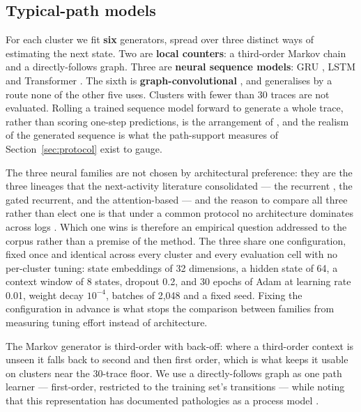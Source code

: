 \subsection{Typical-path models}\label{sec:typical-paths}

For each cluster we fit \textbf{six} generators, spread over three distinct ways of estimating
the next state. Two are \textbf{local counters}: a third-order Markov chain and a
directly-follows graph. Three are \textbf{neural sequence models}: GRU \citep{cho2014gru}, LSTM
\citep{hochreiter1997lstm} and Transformer \citep{vaswani2017attention}. The sixth is
\textbf{graph-convolutional} \citep{kipf2017gcn}, and generalises by a route none of the other
five uses. Clusters with fewer than 30 traces are not evaluated. Rolling a trained sequence model
forward to generate a whole trace, rather than scoring one-step predictions, is the arrangement
of \citet{camargo2019lstm}, and the realism of the generated sequence is what the path-support
measures of Section~\ref{sec:protocol} exist to gauge.

The three neural families are not chosen by architectural preference: they are the three lineages
that the next-activity literature consolidated --- the recurrent \citep{tax2017lstm}, the gated
recurrent, and the attention-based \citep{bukhsh2021processtransformer} --- and the reason to
compare all three rather than elect one is that under a common protocol no architecture dominates
across logs \citep{ramamaneiro2023dlppm}. Which one wins is therefore an empirical question
addressed to the corpus rather than a premise of the method. The three share one configuration,
fixed once and identical across every cluster and every evaluation cell with no per-cluster
tuning: state embeddings of 32 dimensions, a hidden state of 64, a context window of 8 states,
dropout 0.2, and 30 epochs of Adam at learning rate 0.01, weight decay $10^{-4}$, batches of
2{,}048 and a fixed seed. Fixing the configuration in advance is what stops the comparison
between families from measuring tuning effort instead of architecture.

The Markov generator is third-order with back-off: where a third-order context is unseen it falls
back to second and then first order, which is what keeps it usable on clusters near the 30-trace
floor. We use a directly-follows graph as one path learner --- first-order, restricted to the
training set's transitions --- while noting that this representation has documented pathologies
as a process model \citep{vanderaalst2019dfg}.

